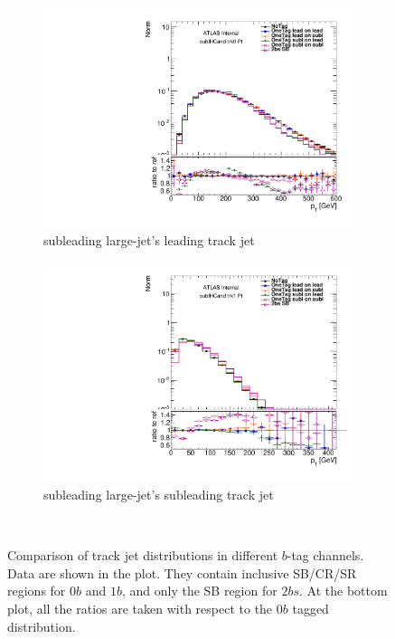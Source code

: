 \begin{figure}[htbp!]
    \begin{subfigure}[b]{0.4\textwidth}
        \includegraphics[width=\textwidth,angle=-90]{figures/boosted/Prereweight/2bs_directcompare_sublHCand_trk0_Pt_1.pdf}
        \caption{subleading large-\R jet's leading track jet \pt}
        \label{fig:rw-2bs-comp-subl0}
    \end{subfigure}
    \quad \quad 
    \begin{subfigure}[b]{0.4\textwidth}
        \includegraphics[width=\textwidth,angle=-90]{figures/boosted/Prereweight/2bs_directcompare_sublHCand_trk1_Pt_1.pdf}
        \caption{subleading large-\R jet's subleading track jet \pt}
        \label{fig:rw-2bs-comp-subl1}
    \end{subfigure} \\ 
   \caption{
   Comparison of track jet \pt distributions in different $b$-tag channels. Data are shown in the plot. They contain inclusive SB/CR/SR regions for 0$b$ and $1b$, and only the SB region for $2bs$. At the bottom plot, all the ratios are taken with respect to the 0$b$ tagged distribution.}
  \label{fig:rw-2bs-comp}
\end{figure}


